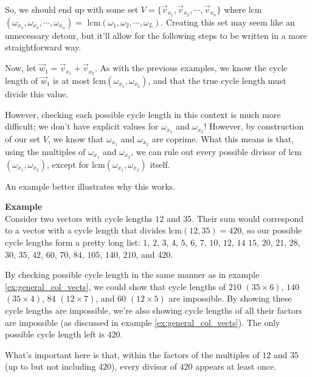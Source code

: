 \documentclass[a4paper, 12pt, reqno]{amsart}
\newcounter{mathexample}[section]
\newenvironment{mathexample}
{
	\refstepcounter{mathexample} %
	\textbf{Example \themathexample} 
	\\
}
{
	\vspace{1cm}
}
\begin{document}
	So, we should end up with some set $V = \{\vec{v}_{x_{1}}, \vec{v}_{x_{2}}, \cdots, \vec{v}_{x_{n}}\}$
	where lcm$(\omega_{x_{1}}, \omega_{x_{2}}, \cdots, \omega_{x_{n}}) = 
	$ lcm$(\omega_{1}, \omega_{2}, \cdots, \omega_{L})$.
	Creating this set may seem like an unnecessary detour, but it'll allow for the following steps 
	to be written in a more straightforward way.
	
	Now, let $\vec{w}_{1} = \vec{v}_{x_{1}} + \vec{v}_{x_{2}}$. As with the previous examples,
	we know the cycle length of $\vec{w}_{1}$ is at most lcm$(\omega_{x_{1}}, \omega_{x_{2}})$,
	and that the true cycle length must divide this value.
	
	However, checking each possible cycle length in this context is much more difficult;
	we don't have explicit values for $\omega_{x_{1}}$ and $\omega_{x_{2}}$! However, by 
	construction of our set $V$, we know that $\omega_{x_{1}}$ and $\omega_{x_{2}}$ are
	coprime. What this means is that, using the multiples of $\omega_{x_{1}}$ 
	and $\omega_{x_{2}}$, we can rule out every possible divisor of lcm$(\omega_{x_{1}}, 
	\omega_{x_{2}})$, except for lcm$(\omega_{x_{1}}, \omega_{x_{2}})$ itself.
	
	An example better illustrates why this works. 
	
	\begin{mathexample}
		\label{ex:specific_coprime_cycle_lengths}
		Consider two vectors with cycle lengths $12$ and $35$. Their sum would correspond to a vector 
		with a cycle length that divides lcm$(12, 35) = 420$, so our possible cycle lengths form a
		pretty long list:	$1$, $2$, $3$, $4$, $5$, $6$, $7$, $10$, $12$, $14$ $15$, $20$, $21$, $28$,
		$30$, $35$, $42$, $60$, $70$, $84$, $105$, $140$, $210$, and $420$.
		
		By checking possible cycle length in the same manner as in example \ref{ex:general_col_vects}, 
		we could show that cycle lengths of $210$ $(35 \times 6)$, $140$ $(35 \times 4)$, $84$ $(12 \times 7)$, 
		and $60$ $(12 \times 5)$ are impossible. By showing these cycle lengths are impossible, we're also 
		showing cycle lengths of all their factors are impossible (as discussed in example 
		\ref{ex:general_col_vects}). The only possible cycle length left is $420$.
		
		What's important here is that, within the factors of the multiples of $12$ and $35$ (up to 
		but not including $420$), every divisor of $420$ appears at least once.
	\end{mathexample}
	
\end{document}
